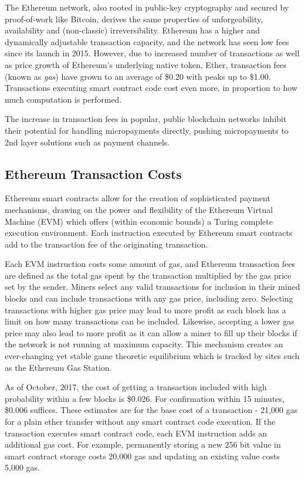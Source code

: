 The Ethereum network, also rooted in public-key cryptography and secured by proof-of-work like Bitcoin, derives the same properties of unforgeability, availability and (non-classic) irreversibility. Ethereum has a higher and dynamically adjustable transaction capacity, and the network has seen low fees since its launch in 2015. However, due to increased number of transactions as well as price growth of Ethereum's underlying native token, Ether, transaction fees (known as \emph{gas}) have grown\cite{BitInfoChartsETH} to an average of \$0.20 with peaks up to \$1.00. Transactions executing smart contract code cost even more, in proportion to how much computation is performed.

The increase in transaction fees in popular, public blockchain networks inhibit their potential for handling micropayments directly, pushing micropayments to 2nd layer solutions such as payment channels.

\subsection{Ethereum Transaction Costs}

Ethereum smart contracts allow for the creation of sophisticated payment mechanisms, drawing on the power and flexibility of the Ethereum Virtual Machine\cite{ETHSpec} (EVM) which offers (within economic bounds) a Turing complete execution environment. Each instruction executed by Ethereum smart contracts add to the transaction fee of the originating transaction.

Each EVM instruction costs some amount of gas, and Ethereum transaction fees are defined as the total gas spent by the transaction multiplied by the gas price set by the sender. Miners select any valid transactions for inclusion in their mined blocks and can include transactions with any gas price, including zero. Selecting transactions with higher gas price may lead to more profit as each block has a limit on how many transactions can be included. Likewise, accepting a lower gas price may also lead to more profit as it can allow a miner to fill up their blocks if the network is not running at maximum capacity. This mechanism creates an ever-changing yet stable game theoretic equilibrium which is tracked by sites such as the Ethereum Gas Station\cite{ETHGas}.

As of October, 2017, the cost of getting a transaction included with high probability within a few blocks is \$0.026. For confirmation within 15 minutes, \$0.006 suffices. These estimates are for the base cost of a transaction - 21,000 gas for a plain ether transfer without any smart contract code execution. If the transaction executes smart contract code, each EVM instruction adds an additional gas cost. For example, permanently storing a new 256 bit value in smart contract storage costs 20,000 gas and updating an existing value costs 5,000 gas.

